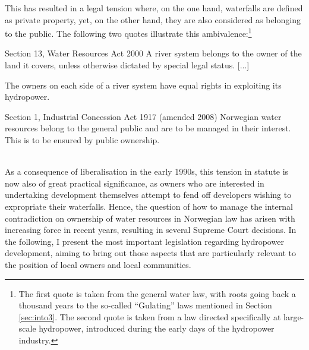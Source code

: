 
This has resulted in a legal tension where, on the one hand, waterfalls are defined as private property, yet, on the other hand, they are also considered as belonging to the public. The following two quotes illustrate this ambivalence:\footnote{The first quote is taken from the general water law, with roots going back a thousand years to the so-called ``Gulating'' laws mentioned in Section \ref{sec:into3}. The second quote is taken from a law directed specifically at large-scale hydropower, introduced during the early days of the hydropower industry.}

{\begin{minipage}[t]{16em}
 \begin{aquote}{\tiny Section 13, Water Resources Act 2000} \footnotesize A river system belongs to the owner of the land it covers, unless otherwise dictated by special legal status. [...]

The owners on each side of a river system have equal rights in exploiting its hydropower.
\end{aquote}  
\end{minipage}}
{\begin{minipage}[t]{22em}
\begin{aquote}{\tiny Section 1, Industrial Concession Act 1917 (amended 2008)} \footnotesize Norwegian water resources belong to the general public and are to be managed in their interest. This is to be ensured by public ownership.
\end{aquote}
\end{minipage}} \\

As a consequence of liberalisation in the early 1990s, this tension in statute is now also of great practical significance, as owners who are interested in undertaking development themselves attempt to fend off developers wishing to expropriate their waterfalls. Hence, the question of how to manage the internal contradiction on ownership of water resources in Norwegian law has arisen with increasing force in recent years, resulting in several Supreme Court decisions. In the following, I present the most important legislation regarding hydropower development, aiming to bring out those aspects that are particularly relevant to the position of local owners and local communities.

